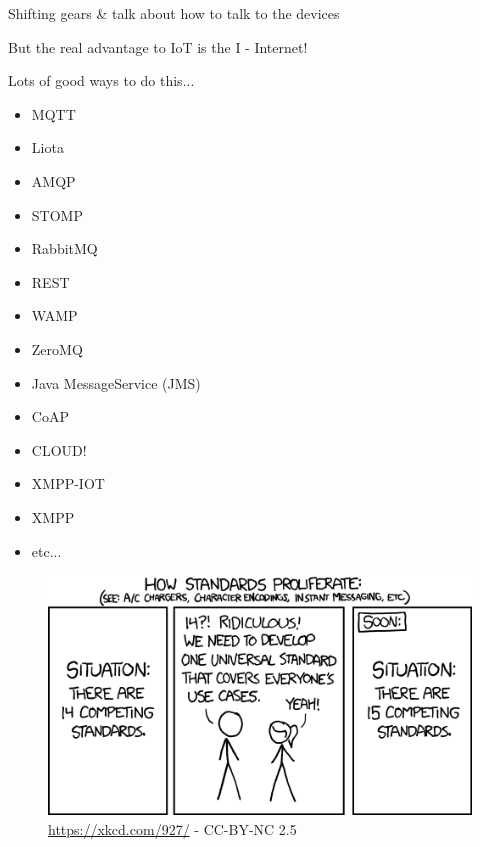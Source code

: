 \begin{frame}
	{Shifting gears \& talk about how to talk to the devices}

	But the real advantage to IoT is the I - Internet!

	Lots of good ways to do this...

	\begin{multicols}{2}
		\begin{small}
		\begin{multicols}{2}
			\begin{itemize}
				\item MQTT
				\item Liota
				\item AMQP
				\item STOMP
				\item RabbitMQ
				\item REST
				\item WAMP
				\item ZeroMQ
				\item Java Message\linebreak Service (JMS)
				\item CoAP
				\item CLOUD!
				\item XMPP-IOT
				\item XMPP
				\item etc...
			\end{itemize}
		\end{multicols}
		\end{small}

		\vfill\null
		\columnbreak

		\begin{figure}[H]
			\includegraphics[width=0.95\linewidth]{IMAGES/XKCD_Standards}
			\captionsetup{labelformat=empty}
			\caption{
				{\scriptsize\url{https://xkcd.com/927/} - CC-BY-NC 2.5}
			}
		\end{figure}
	\end{multicols}

\end{frame}

\cprotect\note{
}

